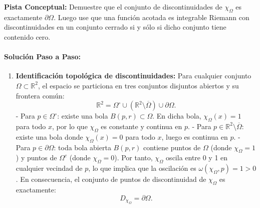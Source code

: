\documentclass[11pt,a4paper]{article}
\begin{document}
\begin{tcolorbox}[colback=yellow!4,colframe=accentamber!70,arc=1mm,boxrule=0.5pt,left=3mm,right=3mm,top=1.5mm,bottom=1.5mm]
\textbf{Pista Conceptual:} Demuestre que el conjunto de discontinuidades de $\chi_\Omega$ es exactamente $\partial \Omega$. Luego use que una función acotada es integrable Riemann con discontinuidades en un conjunto cerrado si y sólo si dicho conjunto tiene contenido cero.
\end{tcolorbox}

\paragraph{Solución Paso a Paso:}\par
\begin{enumerate}[label=\textbf{\arabic*.}]
\item \textbf{Identificación topológica de discontinuidades:}
Para cualquier conjunto $\Omega \subset \mathbb{R}^2$, el espacio se particiona en tres conjuntos disjuntos abiertos y su frontera común:
\begin{equation*}
\mathbb{R}^2 = \Omega^\circ \cup (\mathbb{R}^2 \setminus \overline{\Omega}) \cup \partial \Omega.
\end{equation*}
- Para $p \in \Omega^\circ$: existe una bola $B(p, r) \subset \Omega$. En dicha bola, $\chi_\Omega(x) = 1$ para todo $x$, por lo que $\chi_\Omega$ es constante y continua en $p$.
- Para $p \in \mathbb{R}^2 \setminus \overline{\Omega}$: existe una bola donde $\chi_\Omega(x) = 0$ para todo $x$, luego es continua en $p$.
- Para $p \in \partial \Omega$: toda bola abierta $B(p, r)$ contiene puntos de $\Omega$ (donde $\chi_\Omega = 1$) y puntos de $\Omega^c$ (donde $\chi_\Omega = 0$).
Por tanto, $\chi_\Omega$ oscila entre 0 y 1 en cualquier vecindad de $p$, lo que implica que la oscilación es $\omega(\chi_\Omega, p) = 1 > 0$.
En consecuencia, el conjunto de puntos de discontinuidad de $\chi_\Omega$ es exactamente:
\begin{equation*}
D_{\chi_\Omega} = \partial \Omega.
\end{equation*}
\end{enumerate}
\end{document}
